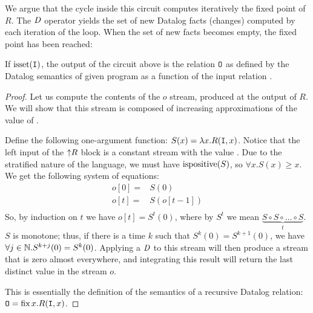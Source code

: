 \begin{algorithm}
\begin{enumerate}[nosep, leftmargin=\parindent]
\begin{center}
\end{center}
\end{enumerate}
\end{algorithm}

We argue that the cycle inside this circuit computes iteratively the fixed point of $R$.
The $\mathit{D}$ operator yields the set of new Datalog facts (changes) computed by each iteration of the loop.
When the set of new facts becomes empty, the fixed point has been reached:

\begin{theorem}\label{theorem:recursion}
If $\mbox{isset}(\mbox{\texttt{I}})$, the output of the circuit above is
the relation $\mbox{\texttt{O}}$ as defined by the Datalog semantics of given program
as a function of the input relation .
\end{theorem}
\label{proof-recursion}
\begin{proof}
Let us compute the contents of the $o$ stream, produced at the output
of $R$.  We will show that this stream is composed
of increasing approximations of the value of .

Define the following one-argument function: $S(x) = \lambda x . R(\mbox{\texttt{I}}, x)$.
Notice that the left input of the ${\uparrow}R$ block is a constant stream
with the value .  Due to the stratified nature of the language,
we must have $\mbox{ispositive}(S)$, so $\forall x . S(x) \geq x$.
We get the following system of equations:
$$
\begin{aligned}
o[0] =& S(0) \\
o[t] =& S(o[t-1]) \\
\end{aligned}
$$ 
So, by induction on $t$ we have $o[t] = S^t(0)$, where by 
$S^t$ we mean $\underbrace{S \circ S \circ \ldots \circ S}_{t}$.
$S$ is monotone; thus, if there is a time $k$ such that $S^k(0) = S^{k+1}(0)$, we have 
$\forall j \in \mathbb{N} . S^{k+j}(0) = S^k(0)$.  Applying a $\mathit{D}$ to this stream
will then produce a stream that is zero almost everywhere, and integrating
this result will return the last distinct value in the stream $o$.

This is essentially the definition of the semantics of a recursive Datalog relation:
$\mbox{\texttt{O}} = \mbox{fix}\,x.R(\mbox{\texttt{I}}, x)$.
\end{proof}

